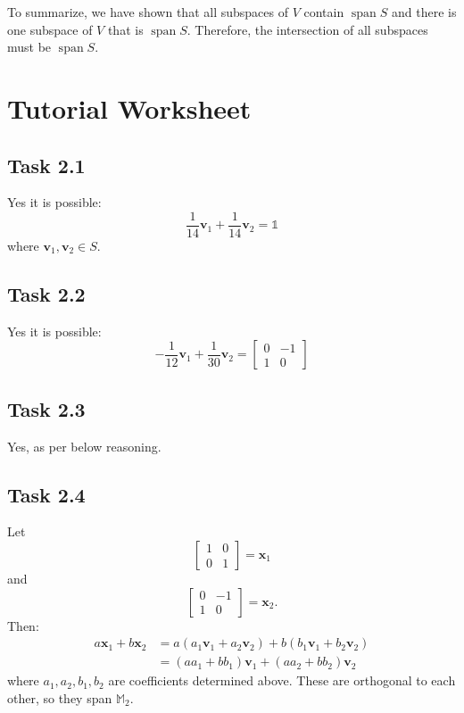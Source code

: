 \documentclass{article}
\DeclareMathOperator{\spn}{span}
\begin{document}
To summarize, we have shown that all subspaces of $V$ contain $\spn S$ and there is one subspace of $V$ that is $\spn S$. Therefore, the intersection of all subspaces must be $\spn S$.
\section{Tutorial Worksheet}
\subsection*{Task 2.1}
Yes it is possible:
\begin{equation}
    \frac{1}{14} \bm{v}_1 + \frac{1}{14} \bm{v}_2 = \mathbb{1}
\end{equation}
where $\bm{v}_1, \bm{v}_2 \in S$.
\subsection*{Task 2.2}
Yes it is possible:
\begin{equation}
    -\frac{1}{12} \bm{v}_1 + \frac{1}{30} \bm{v}_2 = \begin{bmatrix}
        0 & -1 \\ 1 & 0 
    \end{bmatrix}
\end{equation}
\subsection*{Task 2.3}
Yes, as per below reasoning.
\subsection*{Task 2.4}
Let $$\begin{bmatrix}
    1&0\\ 0 & 1
\end{bmatrix} = \bm{x}_1$$ and $$\begin{bmatrix}
    0 & -1 \\ 
    1 & 0
\end{bmatrix} = \bm{x}_2.$$ Then:
\begin{align}
    a\bm{x}_1 + b\bm{x}_2 &= a\left(a_1\bm{v}_1+a_2\bm{v}_2\right) + b\left(b_1\bm{v}_1+b_2\bm{v}_2\right) \\ 
    &= (aa_1+bb_1)\bm{v}_1 + (aa_2+bb_2)\bm{v}_2
\end{align}
where $a_1, a_2, b_1, b_2$ are coefficients determined above. These are orthogonal to each other, so they span $\mathbb{M}_2$.
\end{document}
